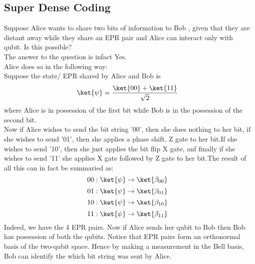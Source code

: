 \subsection{Super Dense Coding}
Suppose Alice wants to share two bits of information to Bob , given that they are distant away while they share an EPR pair and Alice can interact only with qubit. Is this possible?\\
The answer to the question is infact Yes.\\Alice does so in the following way:\\
\newline
Suppose the state/ EPR shared by Alice and Bob is 
$$\ket{\psi} = \frac{\ket{00}+\ket{11}}{\sqrt{2}}$$
where Alice is in possession of the first bit while Bob is in the possession of the second bit.\\
Now if Alice wishes to send the bit string '00', then she does nothing to her bit, if she wishes to send '01', then she applies a phase shift, Z gate to her bit.If she wishes to send '10', then she just applies the bit flip X gate, anf finally if she wishes to send '11' she applies X gate followed by Z gate to her bit.The result of all this can in fact be summaried as:
$$00: \ket{\psi} \to \ket{\beta_{00}}$$
$$01: \ket{\psi} \to \ket{\beta_{01}}$$
$$10: \ket{\psi} \to \ket{\beta_{10}}$$
$$11: \ket{\psi} \to \ket{\beta_{11}}$$
Indeed, we have the 4 EPR pairs. Now if Alice sends her qubit to Bob then Bob has possession of both the qubits. Notice that EPR pairs form an orthonormal basis of the two-qubit space. Hence by making a measurement in the Bell basis, Bob can identify the which bit string was sent by Alice.